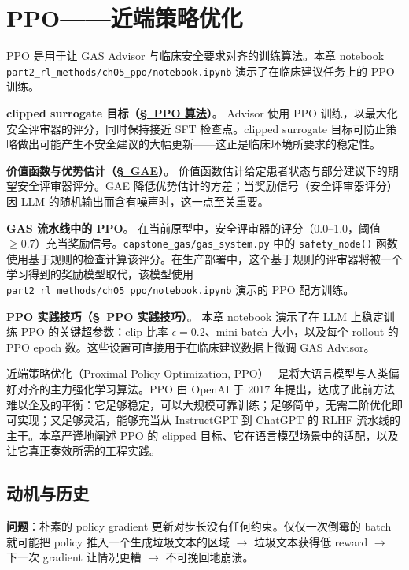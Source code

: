 \chapter{PPO——近端策略优化}
\label{ppo-proximal-policy-optimization}

\begin{keybox}
PPO 是用于让 GAS Advisor 与临床安全要求对齐的训练算法。本章 notebook \texttt{part2\_rl\_methods/ch05\_ppo/notebook.ipynb} 演示了在临床建议任务上的 PPO 训练。

\textbf{clipped surrogate 目标（\hyperref[the-ppo-algorithm]{\S~PPO 算法}）}。
Advisor 使用 PPO 训练，以最大化安全评审器的评分，同时保持接近 SFT 检查点。clipped surrogate 目标可防止策略做出可能产生不安全建议的大幅更新——这正是临床环境所要求的稳定性。

\textbf{价值函数与优势估计（\hyperref[gae-generalised-advantage-estimation]{\S~GAE}）}。
价值函数估计给定患者状态与部分建议下的期望安全评审器评分。GAE 降低优势估计的方差；当奖励信号（安全评审器评分）因 LLM 的随机输出而含有噪声时，这一点至关重要。

\textbf{GAS 流水线中的 PPO}。
在当前原型中，安全评审器的评分（0.0--1.0，阈值 $\geq 0.7$）充当奖励信号。\texttt{capstone\_gas/gas\_system.py} 中的 \texttt{safety\_node()} 函数使用基于规则的检查计算该评分。在生产部署中，这个基于规则的评审器将被一个学习得到的奖励模型取代，该模型使用 \texttt{part2\_rl\_methods/ch05\_ppo/notebook.ipynb} 演示的 PPO 配方训练。

\textbf{PPO 实践技巧（\hyperref[practical-ppo-tips]{\S~PPO 实践技巧}）}。
本章 notebook 演示了在 LLM 上稳定训练 PPO 的关键超参数：clip 比率 $\epsilon = 0.2$、mini-batch 大小，以及每个 rollout 的 PPO epoch 数。这些设置可直接用于在临床建议数据上微调 GAS Advisor。
\end{keybox}

近端策略优化（Proximal Policy Optimization, PPO）~\cite{schulman2017proximal} 是将大语言模型与人类偏好对齐的主力强化学习算法。PPO 由 OpenAI 于 2017 年提出，达成了此前方法难以企及的平衡：它足够稳定，可以大规模可靠训练；足够简单，无需二阶优化即可实现；又足够灵活，能够充当从 InstructGPT 到 ChatGPT 的 RLHF 流水线的主干。本章严谨地阐述 PPO 的 clipped 目标、它在语言模型场景中的适配，以及让它真正奏效所需的工程实践。

\section{动机与历史}
\label{motivation-and-history}

\textbf{问题}：朴素的 policy gradient 更新对步长没有任何约束。仅仅一次倒霉的 batch 就可能把 policy 推入一个生成垃圾文本的区域 $\rightarrow$ 垃圾文本获得低 reward $\rightarrow$ 下一次 gradient 让情况更糟 $\rightarrow$ 不可挽回地崩溃。

